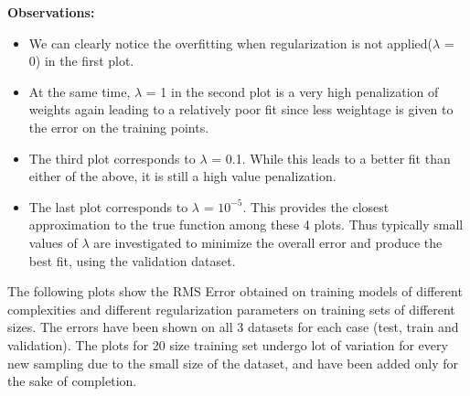\documentclass{article}
\begin{document}
\textbf{Observations: \newline}
\begin{itemize}
\item We can clearly notice the overfitting when regularization is not applied($\lambda$ = 0) in the first plot.
\item At the same time, $\lambda$ = 1 in the second plot is a very high penalization of weights again leading to a relatively poor fit since less weightage is given to the error on the training points. 
\item The third plot corresponds to $\lambda$ = 0.1. While this leads to a better fit than either of the above, it is still a high value penalization.
\item The last plot corresponds to $\lambda$ = $10^{-5}$. This provides the closest approximation to the true function among these 4 plots. Thus typically small values of $\lambda$ are investigated to minimize the overall error and produce the best fit, using the validation dataset. 
\end{itemize}
\newpage
\begin{flushleft}
The following plots show the RMS Error obtained on training models of different complexities and different regularization parameters on training sets of different sizes. The errors have been shown on all 3 datasets for each case (test, train and validation). The plots for 20 size training set undergo lot of variation for every new sampling due to the small size of the dataset, and have been added only for the sake of completion.
\end{flushleft}
\end{document}
